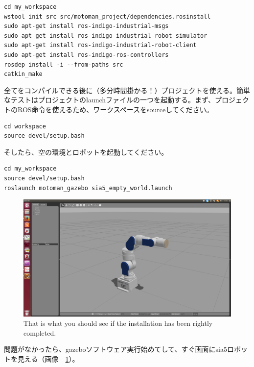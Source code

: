 \begin{lstlisting}
cd my_workspace
wstool init src src/motoman_project/dependencies.rosinstall
sudo apt-get install ros-indigo-industrial-msgs
sudo apt-get install ros-indigo-industrial-robot-simulator
sudo apt-get install ros-indigo-industrial-robot-client
sudo apt-get install ros-indigo-ros-controllers
rosdep install -i --from-paths src
catkin_make
\end{lstlisting}


\begin{CJK}{UTF8}{min}全てをコンパイルできる後に（多分時間掛かる！）プロジェクトを使える。簡単なテストはプロジェクトのlaunchファイルの一つを起動する。まず、プロジェクトのROS命令を使えるため、ワークスペースをsourceしてください。\end{CJK}

\begin{lstlisting}
cd workspace
source devel/setup.bash
\end{lstlisting}


\begin{CJK}{UTF8}{min}そしたら、空の環境とロボットを起動してください。\end{CJK}

\begin{lstlisting}
cd my_workspace
source devel/setup.bash
roslaunch motoman_gazebo sia5_empty_world.launch
\end{lstlisting}
\begin{figure}
\includegraphics[scale=0.132]{images/installation_first/launch_gazebo.png}
\centering
\caption{That is what you should see if the installation has been rightly completed.}
\label{fig:launch_gazebo}
\end{figure}


\begin{CJK}{UTF8}{min}問題がなかったら、gazeboソフトウェア実行始めてして、すぐ画面にsia5ロボットを見える（画像　\ref{fig:launch_gazebo}）。\end{CJK}


